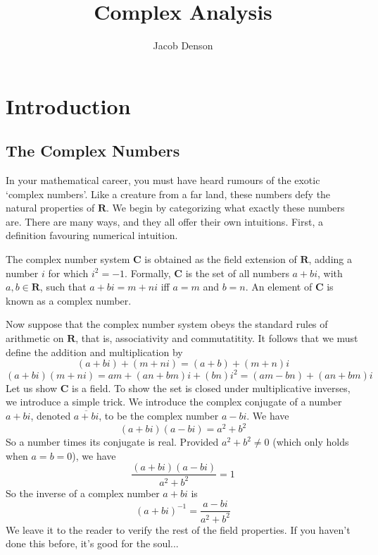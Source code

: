 

\title{Complex Analysis}
\author{Jacob Denson}



\maketitle
\tableofcontents
{}

\chapter{Introduction}

\section{The Complex Numbers}

In your mathematical career, you must have heard rumours of the exotic `complex numbers'. Like a creature from a far land, these numbers defy the natural properties of $\mathbf{R}$. We begin by categorizing what exactly these numbers are. There are many ways, and they all offer their own intuitions. First, a definition favouring numerical intuition.

\begin{definition}
    The complex number system $\mathbf{C}$ is obtained as the field extension of $\mathbf{R}$, adding a number $i$ for which $i^2 = -1$. Formally, $\mathbf{C}$ is the set of all numbers $a + bi$, with $a,b \in \mathbf{R}$, such that $a + bi = m + ni$ iff $a = m$ and $b = n$. An element of $\mathbf{C}$ is known as a complex number.
\end{definition}

Now suppose that the complex number system obeys the standard rules of arithmetic on $\mathbf{R}$, that is, associativity and commutatitity. It follows that we must define the addition and multiplication by
%
\[ (a + bi) + (m + ni) = (a + b) + (m + n)i \]
\[ (a + bi)(m + ni) = am + (an + bm)i + (bn)i^2 = (am - bn) + (an + bm)i \]
%
Let us show $\mathbf{C}$ is a field. To show the set is closed under multiplicative inverses, we introduce a simple trick. We introduce the complex conjugate of a number $a + bi$, denoted $\overline{a + bi}$, to be the complex number $a - bi$. We have
%
\[ (a + bi)(a - bi) = a^2 + b^2 \]
%
So a number times its conjugate is real. Provided $a^2 + b^2 \neq 0$ (which only holds when $a = b = 0$), we have
%
\[ \frac{(a + bi)(a - bi)}{a^2 + b^2} = 1 \]
%
So the inverse of a complex number $a + bi$ is
%
\[ (a + bi)^{-1} = \frac{a - bi}{a^2 + b^2} \]
%
We leave it to the reader to verify the rest of the field properties. If you haven't done this before, it's good for the soul...

